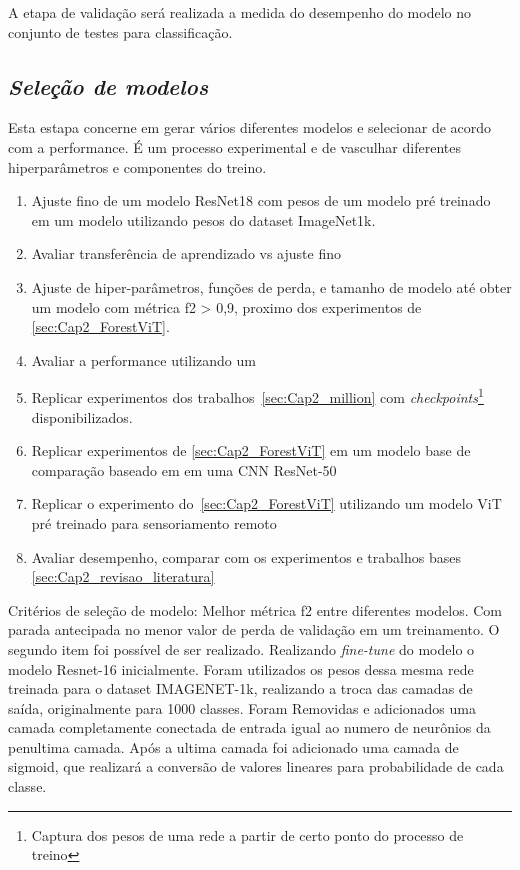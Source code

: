 A etapa de validação será realizada a medida do desempenho do modelo no conjunto de testes para classificação.

\subsection{\textit{Seleção de modelos}}\label{sec:Cap3_SelecaoModelos}

Esta estapa concerne em gerar vários diferentes modelos e selecionar de acordo com a performance. É um processo experimental e de vasculhar diferentes hiperparâmetros e componentes do treino.


\begin{enumerate}
    \item  Ajuste fino de um modelo ResNet18 com pesos de um modelo pré treinado  em um modelo utilizando pesos do dataset ImageNet1k.
    \item Avaliar transferência de aprendizado vs ajuste fino
    \item  Ajuste de hiper-parâmetros, funções de perda, e tamanho de modelo até obter um modelo com métrica f2 > 0,9, proximo dos experimentos de \ref{sec:Cap2_ForestViT}.
    \item Avaliar a performance utilizando um 
    \item  Replicar experimentos dos trabalhos~\ref{sec:Cap2_million} com \textit{checkpoints}\footnote{Captura dos pesos de uma rede a partir de certo ponto do processo de treino} disponibilizados. 
    \item  Replicar experimentos de \ref{sec:Cap2_ForestViT} em um modelo base de comparação baseado em em uma CNN ResNet-50
    \item  Replicar o experimento do~\ref{sec:Cap2_ForestViT} utilizando um modelo ViT pré treinado para sensoriamento remoto
    \item Avaliar desempenho, comparar com os experimentos e trabalhos bases \ref{sec:Cap2_revisao_literatura}
    \end{enumerate}

Critérios de seleção de modelo:
Melhor métrica f2 entre diferentes modelos. Com parada antecipada no menor valor de perda de validação em um treinamento.
O segundo item foi possível de ser realizado. Realizando \textit{fine-tune} do modelo o modelo Resnet-16 inicialmente. Foram utilizados os pesos dessa mesma rede treinada para o dataset IMAGENET-1k, realizando a troca das camadas de saída, originalmente para 1000 classes. Foram Removidas e adicionados uma camada completamente conectada de entrada igual ao numero de neurônios da penultima camada. Após a ultima camada foi adicionado uma camada de sigmoid, que realizará a conversão de valores lineares para probabilidade de cada classe.

